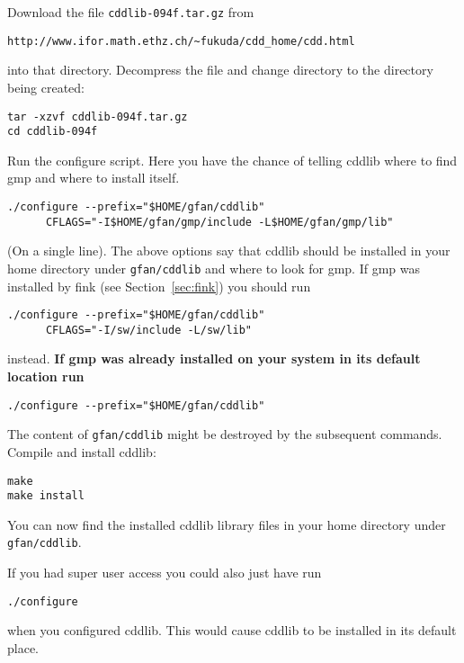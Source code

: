 \noindent
Download the file {\tt cddlib-094f.tar.gz} from
\begin{verbatim}
http://www.ifor.math.ethz.ch/~fukuda/cdd_home/cdd.html
\end{verbatim}
into that directory.
Decompress the file and change directory to the directory being created:
\begin{verbatim}
tar -xzvf cddlib-094f.tar.gz
cd cddlib-094f
\end{verbatim}
Run the configure script. \color{black} Here you have the chance of telling cddlib where to find gmp and where to install itself.
\begin{verbatim}
./configure --prefix="$HOME/gfan/cddlib"
      CFLAGS="-I$HOME/gfan/gmp/include -L$HOME/gfan/gmp/lib"
\end{verbatim}
(On a single line).
The above options say that cddlib should be installed in your home directory under {\tt gfan/cddlib} and where to look for gmp. If gmp was installed by fink (see Section~\ref{sec:fink}) you should run
\begin{verbatim}
./configure --prefix="$HOME/gfan/cddlib"
      CFLAGS="-I/sw/include -L/sw/lib"
\end{verbatim}
instead. {\bf If gmp was already installed on your system in its default location run}
\color{red}
\begin{verbatim}
./configure --prefix="$HOME/gfan/cddlib"
\end{verbatim}
\color{black}
The content of {\tt gfan/cddlib} might be destroyed by the subsequent commands.
Compile and install cddlib:
\color{red}
\begin{verbatim}
make
make install
\end{verbatim}
\color{black}
You can now find the installed cddlib library files in your home directory under {\tt gfan/cddlib}.

\noindent
If you had super user access you could also just have run
\begin{verbatim}
./configure
\end{verbatim}
when you configured cddlib. This would cause cddlib to be installed in its default place.

